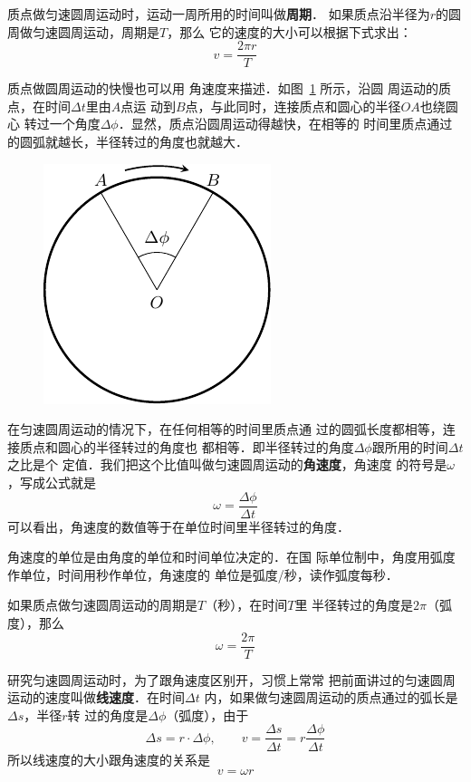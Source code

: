     质点做匀速圆周运动时，运动一周所用的时间叫做\textbf{周期}．
如果质点沿半径为$r$的圆周做匀速圆周运动，周期是$T$，那么
它的速度的大小可以根据下式求出：
\begin{equation}\label{eq_A_4-1}
v=\frac{2\pi r}{T}
\end{equation}

    质点做圆周运动的快慢也可以用
角速度来描述．如图~\ref{fig_A_4-16} 所示，沿圆
周运动的质点，在时间$\Delta t$里由$A$点运
动到$B$点，与此同时，连接质点和圆心的半径$OA$也绕圆心
转过一个角度$\Delta \phi$．显然，质点沿圆周运动得越快，在相等的
时间里质点通过的圆弧就越长，半径转过的角度也就越大．

\begin{figure}[htbp]
    \centering
    \includegraphics{fig/A/4-16.pdf}
    \caption{}\label{fig_A_4-16}
\end{figure}

    在匀速圆周运动的情况下，在任何相等的时间里质点通
过的圆弧长度都相等，连接质点和圆心的半径转过的角度也
都相等．即半径转过的角度$\Delta \phi$跟所用的时间$\Delta t$之比是个
定值．我们把这个比值叫做匀速圆周运动的\textbf{角速度}，角速度
的符号是$\omega$，写成公式就是
\[\omega=\frac{\Delta \phi}{\Delta t}\]
可以看出，角速度的数值等于在单位时间里半径转过的角度．

    角速度的单位是由角度的单位和时间单位决定的．在国
际单位制中，角度用弧度作单位，时间用秒作单位，角速度的
单位是弧度/秒，读作弧度每秒．

    如果质点做匀速圆周运动的周期是$T$（秒），在时间$T$里
半径转过的角度是$2\pi$（弧度），那么
\begin{equation}\label{eq_A_4-2}
\omega=\frac{2\pi}{T}
\end{equation}

    研究匀速圆周运动时，为了跟角速度区别开，习惯上常常
把前面讲过的匀速圆周运动的速度叫做\textbf{线速度}．在时间$\Delta t$
内，如果做匀速圆周运动的质点通过的弧长是$\Delta s$，半径$r$转
过的角度是$\Delta \phi$（弧度），由于
\[\Delta s=r\cdot \Delta \phi, \qquad v=\frac{\Delta s}{\Delta t}=r\frac{\Delta \phi}{\Delta t} \]
所以线速度的大小跟角速度的关系是
\begin{equation}\label{eq_A_4-3}
v=\omega r
\end{equation}

